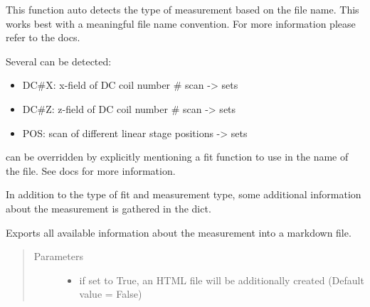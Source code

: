 \documentclass[letterpaper,10pt,english]{sphinxmanual}
\begin{document}
\begin{fulllineitems}
\begin{fulllineitems}
\label{\detokenize{measurement:measurement.Measurement.detect_measurement_type}}
This function auto detects the type of measurement based on the file
name. This works best with a meaningful file name convention. For more
information please refer to the docs.

Several  can be detected:
\begin{itemize}
\item {} 
DC\#X: x-field of DC coil number \# scan -\textgreater{} sets 

\item {} 
DC\#Z: z-field of DC coil number \# scan -\textgreater{} sets 

\item {} 
POS: scan of different linear stage positions -\textgreater{} sets 

\end{itemize}

 can be overridden by explicitly mentioning a fit function to use
in the name of the file. See docs for more information.

In addition to the type of fit and measurement type, some additional
information about the measurement is gathered in the  dict.

\end{fulllineitems}


\begin{fulllineitems}
\label{\detokenize{measurement:measurement.Measurement.export_meta}}
Exports all available information about the measurement into
a markdown file.
\begin{quote}\begin{description}
\item[{Parameters}] \leavevmode\begin{itemize}
\item {} 
 \textendash{} if set to True, an HTML file will be additionally
created (Default value = False)


\end{itemize}
\end{description}
\end{quote}
\end{fulllineitems}
\end{fulllineitems}
\end{document}
